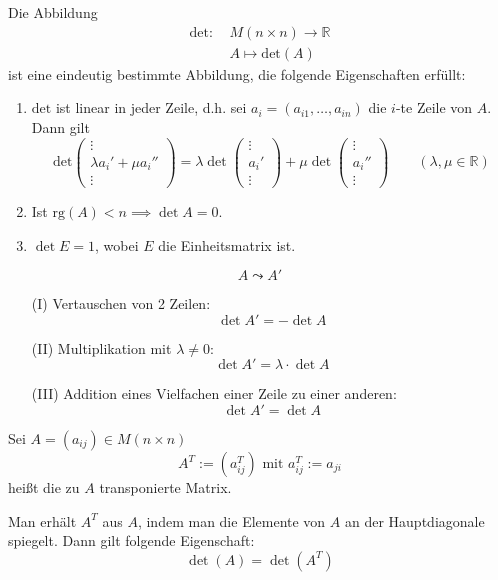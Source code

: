 \begin{theorem}
    Die Abbildung
    \begin{align*}
        \mathrm{det}: &\ M(n\times n)\to \mathbb{R}\\
        &\ A\mapsto \mathrm{det}(A)
    \end{align*}
    ist eine eindeutig bestimmte Abbildung, die folgende Eigenschaften erfüllt:
    \begin{enumerate}
        \item $\mathrm{det}$ ist linear in jeder Zeile, d.h. sei $a_i=(a_{i1},\dots,a_{in})$ die $i$-te Zeile
        von $A$. Dann gilt
        \[
            \mathrm{det}\begin{pmatrix}
                \vdots\\
                \lambda a_i' + \mu a_i''\\
                \vdots
            \end{pmatrix} = \lambda\det \begin{pmatrix}
                \vdots\\a_i'\\\vdots
            \end{pmatrix} + \mu\det \begin{pmatrix}
                \vdots\\a_i''\\\vdots
            \end{pmatrix}\qquad (\lambda, \mu\in\mathbb{R})
        \]
        \item Ist $\mathrm{rg}(A) < n\implies\det A  = 0$.
        \item $\det E  = 1$, wobei $E$ die Einheitsmatrix ist.
    \end{enumerate}
\end{theorem}
\begin{definition}
    \[
        A \leadsto A'
    \]
    \begin{enumerate}
        \item[(I)] Vertauschen von 2 Zeilen:
        \[
            \det A' = -\det A
        \]
        \item[(II)] Multiplikation mit $\lambda\neq 0$:
        \[
            \det A'=\lambda\cdot \det A
        \]
        \item[(III)] Addition eines Vielfachen einer Zeile zu einer anderen:
        \[
            \det A' = \det A
        \]
    \end{enumerate}
\end{definition}
\begin{definition}
    Sei $A=(a_{ij})\in M(n\times n)$
    \[
        A^T := (a_{ij}^T)\text{ mit } a_{ij}^T:= a_{ji}
    \]
    heißt die zu $A$ transponierte Matrix.

    Man erhält $A^T$ aus $A$, indem man die Elemente von $A$ an der Hauptdiagonale spiegelt. Dann gilt folgende
    Eigenschaft:
    \[
        \det(A) = \det (A^T)
    \]
\end{definition}
